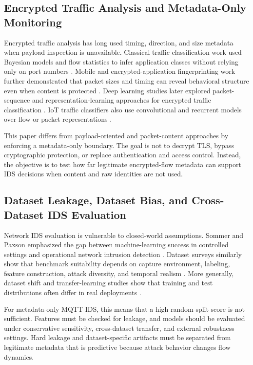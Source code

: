 \documentclass[lettersize,journal]{IEEEtran}
\begin{document}
\subsection{Encrypted Traffic Analysis and Metadata-Only Monitoring}
Encrypted traffic analysis has long used timing, direction, and size metadata when payload inspection is unavailable. Classical traffic-classification work used Bayesian models and flow statistics to infer application classes without relying only on port numbers \cite{moore2005bayesian}. Mobile and encrypted-application fingerprinting work further demonstrated that packet sizes and timing can reveal behavioral structure even when content is protected \cite{conti2016android,taylor2016appscanner}. Deep learning studies later explored packet-sequence and representation-learning approaches for encrypted traffic classification \cite{lotfollahi2020deeppacket,rezaei2019overview,aceto2019mimetic,wang2017encryptedcnn}. IoT traffic classifiers also use convolutional and recurrent models over flow or packet representations \cite{lopezmartin2017traffic,sivanathan2019iotdevices}.

This paper differs from payload-oriented and packet-content approaches by enforcing a metadata-only boundary. The goal is not to decrypt TLS, bypass cryptographic protection, or replace authentication and access control. Instead, the objective is to test how far legitimate encrypted-flow metadata can support IDS decisions when content and raw identities are not used.

\subsection{Dataset Leakage, Dataset Bias, and Cross-Dataset IDS Evaluation}
Network IDS evaluation is vulnerable to closed-world assumptions. Sommer and Paxson emphasized the gap between machine-learning success in controlled settings and operational network intrusion detection \cite{sommer2010outside}. Dataset surveys similarly show that benchmark suitability depends on capture environment, labeling, feature construction, attack diversity, and temporal realism \cite{ring2019survey}. More generally, dataset shift and transfer-learning studies show that training and test distributions often differ in real deployments \cite{quionero2009datasetshift,pan2010transfer}.

For metadata-only MQTT IDS, this means that a high random-split score is not sufficient. Features must be checked for leakage, and models should be evaluated under conservative sensitivity, cross-dataset transfer, and external robustness settings. Hard leakage and dataset-specific artifacts must be separated from legitimate metadata that is predictive because attack behavior changes flow dynamics.
\end{document}

